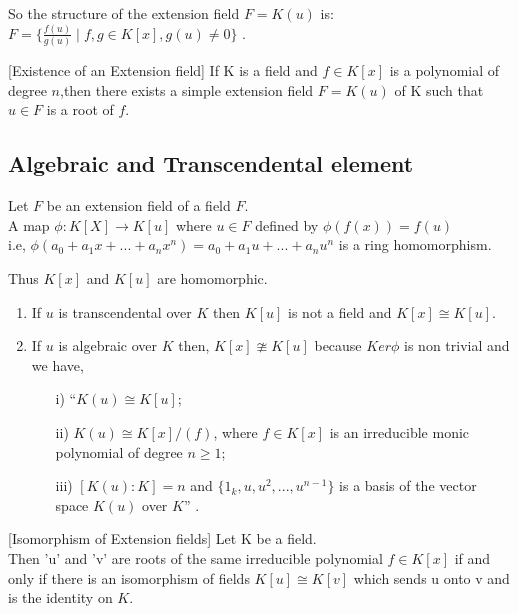 So the structure of the extension field \(F=K(u)\) is:\\
\(F= \{\frac{f(u)}{g(u)} \;| \; f,g \in K[x],g(u) \neq 0\}\) \cite{hunger}.\\

\begin{theorem} \cite{hunger} [Existence of an Extension field]
If K is a field and \(f \in K[x]\) is a polynomial of degree \(n\),then there exists a simple extension field \(F=K(u)\) of K such that \(u\in F\) is a root of \(f\).
\end{theorem}

\subsection{Algebraic and Transcendental element}
\begin{theorem} \cite{hunger}
Let \(F\) be an extension field of a field \(F\).\\
A map \(\phi:K[X] \rightarrow K[u]\) where \(u \in F\) defined by \(\phi (f(x))=f(u)\)\\
i.e, \(\phi (a_0+a_1x+...+a_nx^n)= a_0+a_1u+...+a_nu^n\) is a ring homomorphism.
\end{theorem}

Thus \( K[x]\) and \(K[u]\) are homomorphic.
  \begin{enumerate}
  \item If \(u\) is transcendental over \(K\) then \(K[u]\) is not a field and \(K[x] \cong K[u]\).
  \item If \(u\) is algebraic over \(K\) then, \(K[x] \ncong K[u]\) because \(Ker\phi\) is non trivial and we have,
    \begin{enumerate}
    \item[i)] ``\(K(u) \cong K[u]\);
    \item[ii)] \(K(u) \cong K[x]/(f)\), where \(f \in K[x]\) is an irreducible monic polynomial of degree \(n \geq 1\);
    \item[iii)] \([K(u):K]=n\) and \(\{1_k,u,u^2,...,u^{n-1}\}\) is a basis of the vector space \(K(u)\) over \(K\)'' \cite{hunger}.
    \end{enumerate}
  \end{enumerate}

\begin{theorem} \cite{hunger} [Isomorphism of Extension fields]
 Let K be a field.\\
 Then 'u' and 'v' are  roots of the same irreducible polynomial \(f \in K[x]\) if and only if there is an isomorphism of fields \(K[u] \cong K[v]\) which sends u onto v and is the identity on \(K\).
\end{theorem}

